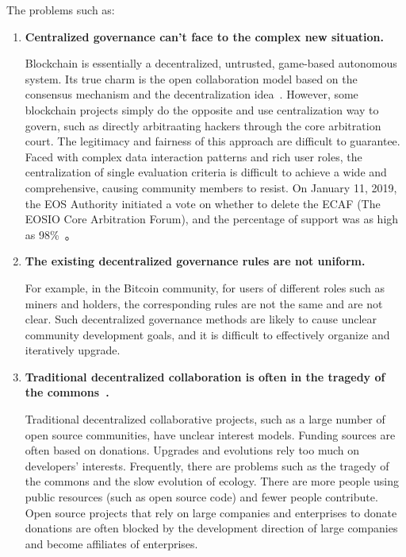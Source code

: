 The problems such as:

\begin{enumerate}
	\item 

	\textbf{Centralized governance can't face to the complex new situation.}

	Blockchain is essentially a decentralized, untrusted, game-based autonomous system. Its true charm is the open collaboration model based on the consensus mechanism and the decentralization idea~\cite{whitepaper}. However, some blockchain projects simply do the opposite and use centralization way to govern, such as directly arbitraating hackers through the core arbitration court. The legitimacy and fairness of this approach are difficult to guarantee. Faced with complex data interaction patterns and rich user roles, the centralization of single evaluation criteria is difficult to achieve a wide and comprehensive, causing community members to resist. On January 11, 2019, the EOS Authority initiated a vote on whether to delete the ECAF (The EOSIO Core Arbitration Forum), and the percentage of support was as high as 98\%~\cite{DeleteECAF}。

	\item 

	\textbf{The existing decentralized governance rules are not uniform.}

	For example, in the Bitcoin community, for users of different roles such as miners and holders, the corresponding rules are not the same and are not clear. Such decentralized governance methods are likely to cause unclear community development goals, and it is difficult to effectively organize and iteratively upgrade.

	\item 

	\textbf{Traditional decentralized collaboration is often in the tragedy of the commons~\cite{TragedyOfTheCommons}.}

	Traditional decentralized collaborative projects, such as a large number of open source communities, have unclear interest models. Funding sources are often based on donations. Upgrades and evolutions rely too much on developers' interests. Frequently, there are problems such as the tragedy of the commons and the slow evolution of ecology. There are more people using public resources (such as open source code) and fewer people contribute. Open source projects that rely on large companies and enterprises to donate donations are often blocked by the development direction of large companies and become affiliates of enterprises.


\end{enumerate}
